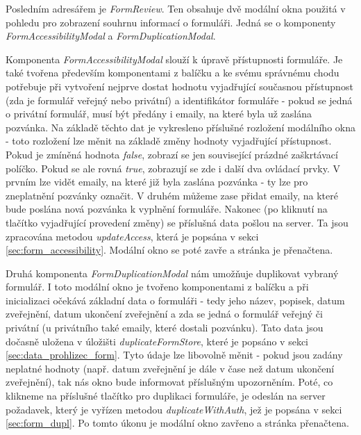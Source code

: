 			\label{sec:modalni_okna_man_form}
			Posledním adresářem je \textit{FormReview}. Ten obsahuje dvě modální okna použitá v pohledu pro zobrazení souhrnu informací o formuláři. Jedná se o komponenty \textit{FormAccessibilityModal} a \textit{FormDuplicationModal}.
			
			Komponenta \textit{FormAccessibilityModal} slouží k úpravě přístupnosti formuláře. Je také tvořena především komponentami z balíčku  a ke svému správnému chodu potřebuje při vytvoření nejprve dostat hodnotu vyjadřující současnou přístupnost (zda je formulář veřejný nebo privátní) a identifikátor formuláře - pokud se jedná o privátní formulář, musí být předány i emaily, na které byla už zaslána pozvánka. Na základě těchto dat je vykresleno příslušné rozložení modálního okna - toto rozložení lze měnit na základě změny hodnoty vyjadřující přístupnost. Pokud je zmíněná hodnota \textit{false}, zobrazí se jen související prázdné zaškrtávací políčko. Pokud se ale rovná \textit{true}, zobrazují se zde i další dva ovládací prvky. V prvním lze vidět emaily, na které již byla zaslána pozvánka - ty lze pro zneplatnění pozvánky označit. V druhém můžeme zase přidat emaily, na které bude poslána nová pozvánka k vyplnění formuláře. Nakonec (po kliknutí na tlačítko vyjadřující provedení změny) se příslušná data pošlou na server. Ta jsou zpracována metodou \textit{updateAccess}, která je popsána v sekci \ref{sec:form_accessibility}. Modální okno se poté zavře a stránka je přenačtena.
			
			Druhá komponenta \textit{FormDuplicationModal} nám umožňuje duplikovat vybraný formulář. I toto modální okno je tvořeno komponentami z balíčku  a při inicializaci očekává základní data o formuláři - tedy jeho název, popisek, datum zveřejnění, datum ukončení zveřejnění a zda se jedná o formulář veřejný či privátní (u privátního také emaily, které dostali pozvánku). Tato data jsou dočasně uložena v úložišti \textit{duplicateFormStore}, které je popsáno v sekci \ref{sec:data_prohlizec_form}. Tyto údaje lze libovolně měnit - pokud jsou zadány neplatné hodnoty (např. datum zveřejnění je dále v čase než datum ukončení zveřejnění), tak nás okno bude informovat příslušným upozorněním. Poté, co klikneme na příslušné tlačítko pro duplikaci formuláře, je odeslán na server požadavek, který je vyřízen metodou \textit{duplicateWithAuth}, jež je popsána v sekci \ref{sec:form_dupl}. Po tomto úkonu je modální okno zavřeno a stránka přenačtena.
		
